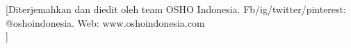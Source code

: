 \usepackage[pagestyles,extramarks]{titlesec}


\titleformat{\chapter}[hang]{\filleft\bfseries\huge}{\MakeUppercase{\chaptertitlename\hspace{.5pt}\thechapter}}{.5em}{}[\vspace{2ex}\titlerule \small Diterjemahkan dan diedit oleh team OSHO Indonesia. Fb/ig/twitter/pinterest: @oshoindonesia. Web: www.oshoindonesia.com \\ \vspace{5ex}\titlerule]





